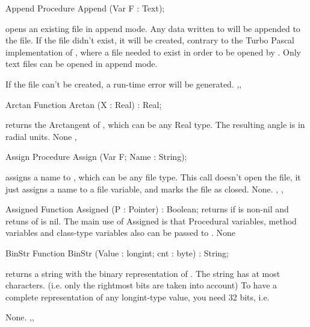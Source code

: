 \documentclass{report}
\begin{document}

\begin{procedure}{Append}
\Declaration
Procedure Append (Var F : Text);

\Description
{} opens an existing file in append mode. Any data written to
 will be appended to the file. If the file didn't exist, it will be
created, contrary to the Turbo Pascal implementation of , where
a file needed to exist in order to be opened by
.
Only text files can be opened in append mode.

\Errors
If the file can't be created, a run-time error will be generated.
\SeeAlso
{},, 
\end{procedure}


\begin{function}{Arctan}
\Declaration
Function Arctan (X : Real) : Real;

\Description
{} returns the Arctangent of , which can be any Real type.
The resulting angle is in radial units.
\Errors
None
\SeeAlso
{}, 
\end{function}


\begin{procedure}{Assign}
\Declaration
Procedure Assign (Var F; Name : String);

\Description
{} assigns a name to , which can be any file type.
This call doesn't open the file, it just assigns a name to a file variable,
and marks the file as closed.
\Errors
None.
\SeeAlso
{}, , 
\end{procedure}


\begin{function}{Assigned}
\Declaration
Function Assigned (P : Pointer) : Boolean;
\Description
{} returns  if  is non-nil
and retuns  of  is nil.
The main use of Assigned is that Procedural variables, method variables and
class-type variables also can be passed to .
\Errors
None
\SeeAlso
{}
\end{function}


\begin{function}{BinStr}
\Declaration
Function BinStr (Value : longint; cnt : byte) : String;

\Description
{} returns a string with the binary representation
of . The string has at most  characters.
(i.e. only the  rightmost bits are taken into account)
To have a complete representation of any longint-type value, you need 32
bits, i.e. 

\Errors
None.
\SeeAlso
{},,
\end{function}
\end{document}
